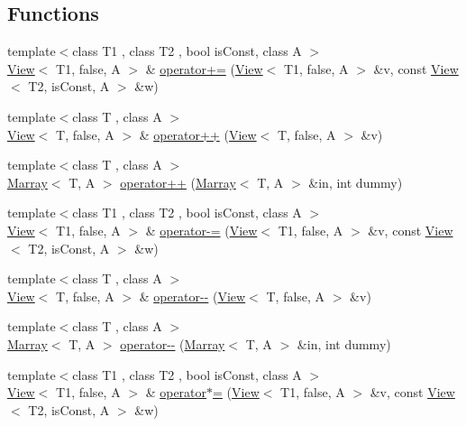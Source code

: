 \subsection*{Functions}
\begin{DoxyCompactItemize}
\item 
{\footnotesize template$<$class T1 , class T2 , bool is\+Const, class A $>$ }\\\hyperlink{classandres_1_1View}{View}$<$ T1, false, A $>$ \& \hyperlink{namespaceandres_a8336b0a095fea76e6b28903e7c9dbe94}{operator+=} (\hyperlink{classandres_1_1View}{View}$<$ T1, false, A $>$ \&v, const \hyperlink{classandres_1_1View}{View}$<$ T2, is\+Const, A $>$ \&w)
\item 
{\footnotesize template$<$class T , class A $>$ }\\\hyperlink{classandres_1_1View}{View}$<$ T, false, A $>$ \& \hyperlink{namespaceandres_af4cbe438bddc157789f80c8528dce4ff}{operator++} (\hyperlink{classandres_1_1View}{View}$<$ T, false, A $>$ \&v)
\item 
{\footnotesize template$<$class T , class A $>$ }\\\hyperlink{classandres_1_1Marray}{Marray}$<$ T, A $>$ \hyperlink{namespaceandres_a4f00ee1858164a9f62899872f38c8f64}{operator++} (\hyperlink{classandres_1_1Marray}{Marray}$<$ T, A $>$ \&in, int dummy)
\item 
{\footnotesize template$<$class T1 , class T2 , bool is\+Const, class A $>$ }\\\hyperlink{classandres_1_1View}{View}$<$ T1, false, A $>$ \& \hyperlink{namespaceandres_a10a01738bed4f67459b210de091d3ea2}{operator-\/=} (\hyperlink{classandres_1_1View}{View}$<$ T1, false, A $>$ \&v, const \hyperlink{classandres_1_1View}{View}$<$ T2, is\+Const, A $>$ \&w)
\item 
{\footnotesize template$<$class T , class A $>$ }\\\hyperlink{classandres_1_1View}{View}$<$ T, false, A $>$ \& \hyperlink{namespaceandres_a162f7a3e5e4ec9d773d17843cbfadd55}{operator-\/-\/} (\hyperlink{classandres_1_1View}{View}$<$ T, false, A $>$ \&v)
\item 
{\footnotesize template$<$class T , class A $>$ }\\\hyperlink{classandres_1_1Marray}{Marray}$<$ T, A $>$ \hyperlink{namespaceandres_a446cb1c63e0aa91200e79a0a762cdb9b}{operator-\/-\/} (\hyperlink{classandres_1_1Marray}{Marray}$<$ T, A $>$ \&in, int dummy)
\item 
{\footnotesize template$<$class T1 , class T2 , bool is\+Const, class A $>$ }\\\hyperlink{classandres_1_1View}{View}$<$ T1, false, A $>$ \& \hyperlink{namespaceandres_a766484f5dd8163c93e833b6438a49f1e}{operator$\ast$=} (\hyperlink{classandres_1_1View}{View}$<$ T1, false, A $>$ \&v, const \hyperlink{classandres_1_1View}{View}$<$ T2, is\+Const, A $>$ \&w)

\end{DoxyCompactItemize}
